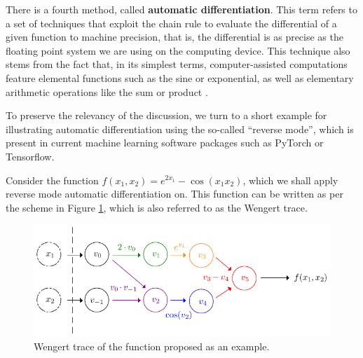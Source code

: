\documentclass[12pt]{report} %
\begin{document}
There is a fourth method, called \textbf{automatic differentiation}. This term refers to a set of techniques that exploit the chain rule to evaluate the differential of a given function to machine precision, that is, the differential is as precise as the floating point system we are using on the computing device. This technique also stems from the fact that, in its simplest terms, computer-assisted computations feature elemental functions such as the sine or exponential, as well as elementary arithmetic operations like the sum or product \cite{verma2000introduction}. 

To preserve the relevancy of the discussion, we turn to a short example for illustrating automatic differentiation using the so-called ``reverse mode'', which is present in current machine learning software packages such as PyTorch or Tensorflow. 

Consider the function $f (x_1, x_2) = e^{2 x_1} - \cos (x_1 x_2)$, which we
shall apply reverse mode automatic differentiation on. This function can be
written as per the scheme in Figure \ref{fig:wengert-trace}, which is also referred to
as the Wengert trace.

\begin{figure}[ht]
    \centering
    \includegraphics[width=\textwidth]{imagenes/wengert-trace.pdf}
    \caption{Wengert trace of the function proposed as an example.}
    \label{fig:wengert-trace}
\end{figure}
\end{document}
